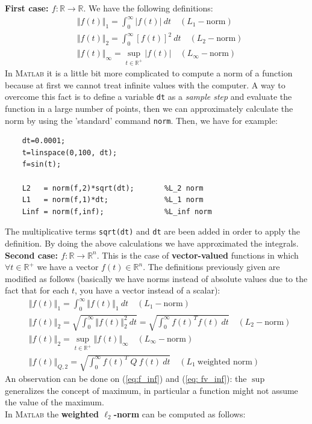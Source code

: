 \noindent
\textbf{First case: $f: \mathbb{R}\to \mathbb{R}$}.
We have the following definitions: 
\begin{align}
    &\Vert f(t) \Vert_1 = \int_{0}^{\infty} {\vert f(t) \vert \ dt} \quad (L_1-\text{norm})\\
    &\Vert f(t) \Vert_2 = \int_{0}^{\infty} {[f(t)]^2 \ dt} \quad (L_2-\text{norm})\\
    &\Vert f(t) \Vert_\infty =  \sup_{t\in\mathbb{R}^+} \vert f(t) \vert \quad (L_\infty-\text{norm}) \label{eq:f_inf}
\end{align}
{\color{red}In \textsc{Matlab}} it is a little bit more complicated to compute a norm of a function because at first we cannot treat infinite values with the computer. A way to overcome this fact is to define a variable \texttt{dt} as a \textit{sample step} and evaluate the function in a large number of points, then we can approximately calculate the norm by using the 'standard' command \texttt{norm}.
Then, we have for example: 
{\color{blue}
\begin{verbatim}
    dt=0.0001;
    t=linspace(0,100, dt); 
    f=sin(t); 

    L2   = norm(f,2)*sqrt(dt);       %L_2 norm
    L1   = norm(f,1)*dt;             %L_1 norm
    Linf = norm(f,inf);              %L_inf norm          
\end{verbatim}
}

The multiplicative terms \texttt{sqrt(dt)} and \texttt{dt} are been added in order to apply the definition. By doing the above calculations we have approximated the integrals.\\


\noindent
\textbf{Second case: $f:\mathbb{R}\to\mathbb{R}^n$}. This is the case of \textbf{vector-valued} functions in which $\forall t \in \mathbb{R}^+$ we have a vector $f(t)\in\mathbb{R}^n$. The definitions previously given are modified as follows (basically we have norms instead of absolute values due to the fact that for each $t$, you have a vector instead of a scalar): 
\begin{align}
    &\Vert f(t) \Vert_1 = \int_{0}^{\infty} \Vert f(t) \Vert_1 \ dt \quad (L_1-\text{norm})\\
    &\Vert f(t) \Vert_2 = \sqrt{\int_{0}^{\infty} \Vert f(t) \Vert_2^2 \ dt}=
    \sqrt{\int_{0}^{\infty} f(t)^Tf(t) \ dt } \quad (L_2-\text{norm})\\
    &\Vert f(t) \Vert_2 = \sup_{t\in\mathbb{R}^+} \Vert f(t) \Vert_\infty \quad (L_\infty-\text{norm}) \label{eq: fv_inf}\\ 
    &\Vert f(t) \Vert_{Q,2} = \sqrt{\int_{0}^{\infty} f(t)^T \ Q \ f(t) \ dt }  \quad (L_1 \  \text{weighted norm})
\end{align}
An observation can be done on (\ref{eq:f_inf}) and (\ref{eq: fv_inf}): the $\sup$ generalizes the concept of maximum, in particular a function might not assume the value of the maximum. \\
{\color{red}In \textsc{Matlab}} the \textbf{weighted $\ell_2$-norm} can be computed as follows:

